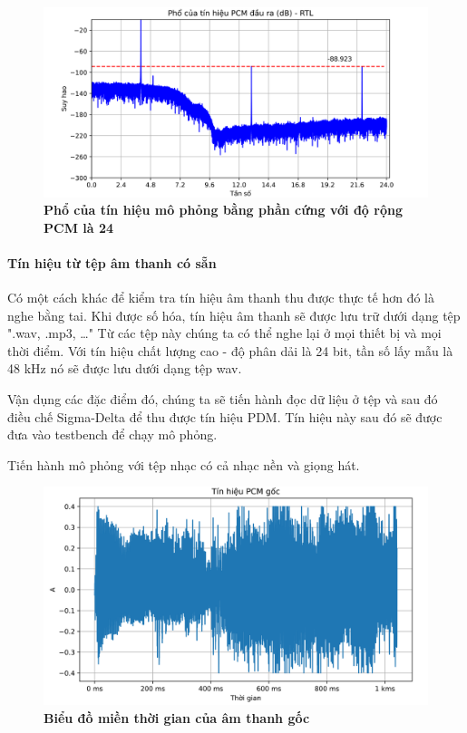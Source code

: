 \begin{figure}[H]
    \centering
    \includegraphics[width=14cm]{Images/Chuong4/tb/sim/psd_sin_2.png}
    \caption[Phổ của tín hiệu mô phỏng bằng phần cứng với độ rộng PCM là 24]{\bfseries \fontsize{12pt}{0pt}\selectfont  Phổ của tín hiệu mô phỏng bằng phần cứng với độ rộng PCM là 24 }
    \label{psd_sin_2}
\end{figure}

\paragraph{Tín hiệu từ tệp âm thanh có sẵn}

Có một cách khác để kiểm tra tín hiệu âm thanh thu được thực tế hơn đó là nghe bằng tai. Khi được số hóa, tín hiệu âm thanh sẽ được lưu trữ dưới dạng tệp ".wav, .mp3, \ldots" Từ các tệp này chúng ta có thể nghe lại ở mọi thiết bị và mọi thời điểm. Với tín hiệu chất lượng cao - độ phân dải là 24 bit, tần số lấy mẫu là 48 kHz nó sẽ được lưu dưới dạng tệp wav.

Vận dụng các đặc điểm đó, chúng ta sẽ tiến hành đọc dữ liệu ở tệp và sau đó điều chế Sigma-Delta để thu được tín hiệu PDM. Tín hiệu này sau đó sẽ được đưa vào testbench để chạy mô phỏng.

Tiến hành mô phỏng với tệp nhạc có cả nhạc nền và giọng hát.

\begin{figure}[H]
    \centering
    \includegraphics[width=14cm]{Images/Chuong4/tb/wav/vldd2_2.png}
    \caption[Biểu đồ miền thời gian của âm thanh gốc]{\bfseries \fontsize{12pt}{0pt}\selectfont Biểu đồ miền thời gian của âm thanh gốc}
    \label{vldd2_2}
\end{figure}

